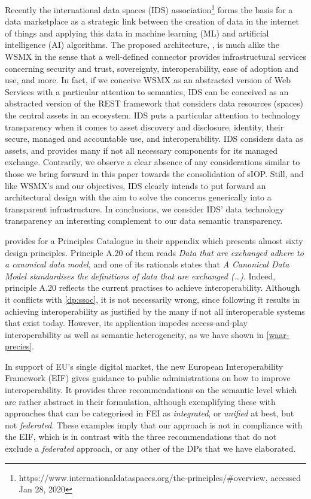 \documentclass[sort&compress,preprint,authoryear,3p,twocolumn]{elsarticle}
\begin{document}
Recently the international data spaces (IDS) association\footnote{https://www.internationaldataspaces.org/the-principles/\#overview,
  accessed Jan 28, 2020} forms the basis for a data marketplace as a
strategic link between the creation of data in the internet of things
and applying this data in machine learning (ML) and artificial
intelligence (AI) algorithms. The proposed architecture,
\citep{Otto2019}, is much alike the WSMX in the sense that a
well-defined connector provides infrastructural services concerning
security and trust, sovereignty, interoperability, ease of adoption and
use, and more. In fact, if we conceive WSMX as an abstracted version of
Web Services with a particular attention to semantics, IDS can be
conceived as an abstracted version of the REST framework that considers
data resources (spaces) the central assets in an ecosystem. IDS puts a
particular attention to technology transparency when it comes to asset
discovery and disclosure, identity, their secure, managed and
accountable use, and interoperability. IDS considers data as assets, and
provides many if not all necessary components for its managed exchange.
Contrarily, we observe a clear absence of any considerations similar to
those we bring forward in this paper towards the consolidation of sIOP.
Still, and like WSMX's and our objectives, IDS clearly intends to put
forward an architectural design with the aim to solve the concerns
generically into a transparent infrastructure. In conclusions, we
consider IDS' data technology transparency an interesting complement to
our data semantic transparency.

\citep{Greefhorst2011} provides for a Principles Catalogue in their
appendix which presents almost sixty design principles. Principle A.20
of them reads \emph{Data that are exchanged adhere to a canonical data
model}, and one of its rationals states that \emph{A Canonical Data
Model standardises the definitions of data that are exchanged (\ldots)}.
Indeed, principle A.20 reflects the current practises to achieve
interoperability. Although it conflicts with \cref{dp:ssoc}, it is not
necessarily wrong, since following it results in achieving
interoperability as justified by the many if not all interoperable
systems that exist today. However, its application impedes
access-and-play interoperability as well as semantic heterogeneity, as
we have shown in \cref{waar-precies}.

In support of EU's single digital market, the new European
Interoperability Framework (EIF) \citep{EU-ISA2Program2019} gives
guidance to public administrations on how to improve interoperability.
It provides three recommendations on the semantic level which are rather
abstract in their formulation, although exemplifying these with
approaches that can be categorised in FEI \citep{Chen2017} as
\emph{integrated}, or \emph{unified} at best, but not \emph{federated}.
These examples imply that our approach is not in compliance with the
EIF, which is in contrast with the three recommendations that do not
exclude a \emph{federated} approach, or any other of the DPs that we
have elaborated.
\end{document}
